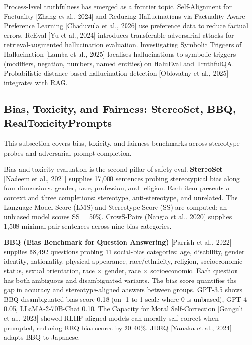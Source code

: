 Process-level truthfulness has emerged as a frontier topic. Self-Alignment for Factuality {[}Zhang et al., 2024{]} and Reducing Hallucinations via Factuality-Aware Preference Learning {[}Chaduvula et al., 2026{]} use preference data to reduce factual errors. ReEval {[}Yu et al., 2024{]} introduces transferable adversarial attacks for retrieval-augmented hallucination evaluation. Investigating Symbolic Triggers of Hallucination {[}Lamba et al., 2025{]} localises hallucinations to symbolic triggers (modifiers, negation, numbers, named entities) on HaluEval and TruthfulQA. Probabilistic distance-based hallucination detection {[}Oblovatny et al., 2025{]} integrates with RAG.

\subsection{Bias, Toxicity, and Fairness: StereoSet, BBQ, RealToxicityPrompts}\label{bias-toxicity-and-fairness-stereoset-bbq-realtoxicityprompts}

This subsection covers bias, toxicity, and fairness benchmarks across stereotype probes and adversarial-prompt completion.

Bias and toxicity evaluation is the second pillar of safety eval. \textbf{StereoSet} {[}Nadeem et al., 2021{]} supplies 17,000 sentences probing stereotypical bias along four dimensions: gender, race, profession, and religion. Each item presents a context and three completions: stereotype, anti-stereotype, and unrelated. The Language Model Score (LMS) and Stereotype Score (SS) are computed; an unbiased model scores SS = 50\%. CrowS-Pairs (Nangia et al., 2020) supplies 1,508 minimal-pair sentences across nine bias categories.

\textbf{BBQ (Bias Benchmark for Question Answering)} {[}Parrish et al., 2022{]} supplies 58,492 questions probing 11 social-bias categories: age, disability, gender identity, nationality, physical appearance, race/ethnicity, religion, socioeconomic status, sexual orientation, race × gender, race × socioeconomic. Each question has both ambiguous and disambiguated variants. The bias score quantifies the gap in accuracy and stereotype-aligned answers between groups. GPT-3.5 shows BBQ disambiguated bias score 0.18 (on -1 to 1 scale where 0 is unbiased), GPT-4 0.05, LLaMA-2-70B-Chat 0.10. The Capacity for Moral Self-Correction {[}Ganguli et al., 2023{]} showed RLHF-aligned models can morally self-correct when prompted, reducing BBQ bias scores by 20-40\%. JBBQ {[}Yanaka et al., 2024{]} adapts BBQ to Japanese.


